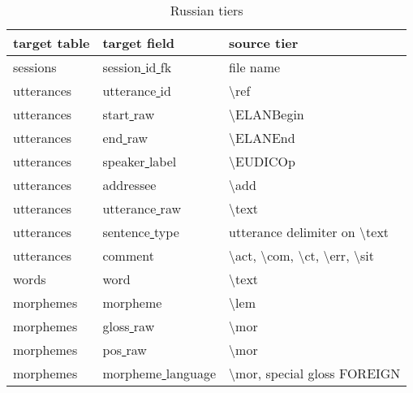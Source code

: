 \documentclass[a4paper, 11pt]{book}
\newcommand{\bks}{\textbackslash}	%
\newcommand{\und}{\underline{{ }}\hspace{0.2mm}}	%
\begin{document}
\begin{table}[ht!]
	\centering
	\begin{tabular}{lll}
		\toprule
			\textbf{target table} & \textbf{target field} & \textbf{source tier} \\
		\midrule
			sessions 	& session\und id\und fk 	& file name \\
			utterances 	& utterance\und id	& \bks ref \\
			utterances 	& start\und raw		& \bks ELANBegin \\
			utterances 	& end\und raw		& \bks ELANEnd \\
			utterances 	& speaker\und label	& \bks EUDICOp \\
			utterances 	& addressee			& \bks add \\
			utterances 	& utterance\und raw & \bks text \\
			utterances 	& sentence\und type	& utterance delimiter on \bks text \\
			utterances 	& comment			& \bks act, \bks com, \bks ct, \bks err, \bks sit \\

			words	 	& word				& \bks text \\
			morphemes	& morpheme			& \bks lem \\
			morphemes	& gloss\und raw		& \bks mor \\
			morphemes	& pos\und raw		& \bks mor \\
			morphemes	& morpheme\und language			& \bks mor, special gloss FOREIGN \\

		\bottomrule
	\end{tabular}
	\caption{Russian tiers}
	\label{tab:Russian tiers}
\end{table}
\end{document}
